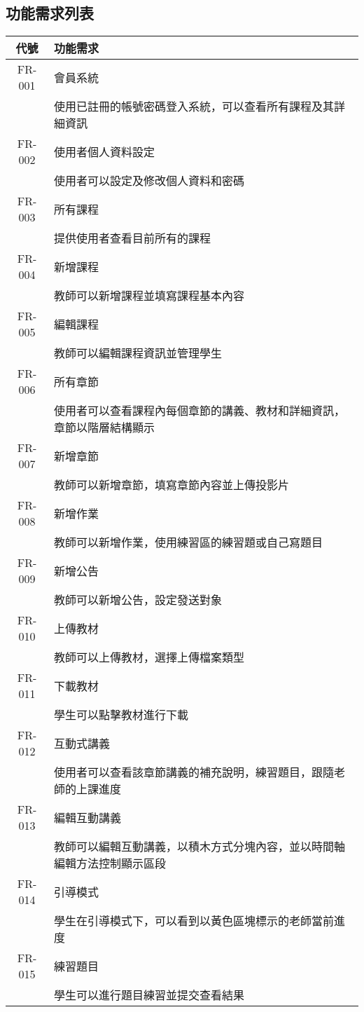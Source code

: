 \documentclass[12pt]{article}
\begin{document}
\subsection{功能需求列表}
\begin{table}[H]
  \centering
  \begin{tabular}{|c|p{10cm}|}
    \hline
    \textbf{代號} & \textbf{功能需求} \\
    \hline
    FR-001 & 會員系統 \\ 
    & 使用已註冊的帳號密碼登入系統，可以查看所有課程及其詳細資訊 \\  \hline
    FR-002 & 使用者個人資料設定 \\ 
    & 使用者可以設定及修改個人資料和密碼 \\  \hline
    FR-003 & 所有課程 \\ 
    & 提供使用者查看目前所有的課程 \\  \hline
    FR-004 & 新增課程 \\ 
    & 教師可以新增課程並填寫課程基本內容 \\  \hline
    FR-005 & 編輯課程 \\ 
    & 教師可以編輯課程資訊並管理學生 \\  \hline
    FR-006 & 所有章節 \\ 
    & 使用者可以查看課程內每個章節的講義、教材和詳細資訊，章節以階層結構顯示 \\  \hline
    FR-007 & 新增章節 \\ 
    & 教師可以新增章節，填寫章節內容並上傳投影片 \\  \hline
    FR-008 & 新增作業 \\ 
    & 教師可以新增作業，使用練習區的練習題或自己寫題目 \\  \hline
    FR-009 & 新增公告 \\ 
    & 教師可以新增公告，設定發送對象 \\  \hline
    FR-010 & 上傳教材 \\ 
    & 教師可以上傳教材，選擇上傳檔案類型 \\  \hline
    FR-011 & 下載教材 \\ 
    & 學生可以點擊教材進行下載 \\  \hline
    FR-012 & 互動式講義 \\ 
    & 使用者可以查看該章節講義的補充說明，練習題目，跟隨老師的上課進度 \\  \hline
    FR-013 & 編輯互動講義 \\ 
    & 教師可以編輯互動講義，以積木方式分塊內容，並以時間軸編輯方法控制顯示區段 \\  \hline
    FR-014 & 引導模式 \\ 
    & 學生在引導模式下，可以看到以黃色區塊標示的老師當前進度 \\  \hline
    FR-015 & 練習題目 \\ 
    & 學生可以進行題目練習並提交查看結果 \\  \hline
  \end{tabular}
\end{table}
\end{document}
